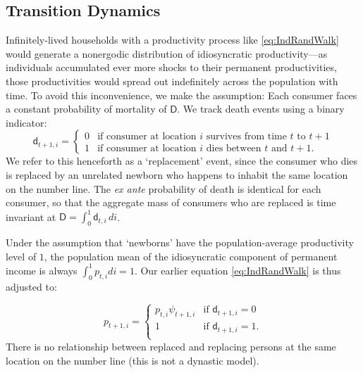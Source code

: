 \documentclass[titlepage]{./econtex}
\begin{document}
\subsection{Transition Dynamics}

Infinitely-lived households with a productivity process like \eqref{eq:IndRandWalk} would generate a nonergodic distribution of idiosyncratic productivity---as individuals accumulated ever more shocks to their permanent productivities, those productivities would spread out indefinitely across the population with time. To avoid this inconvenience, we make the \cite{blanchardFinite} assumption: Each consumer faces a constant probability of mortality of $\mathsf{D}$. We track death events using a binary indicator:
\begin{equation*}
\mathsf{d}_{t+1,i} =
  \begin{cases}
    0 & \text{if consumer at location $i$ survives from time $t$ to $t+1$}
\\    1 & \text{if consumer at location $i$ dies between $t$ and $t+1$}.
  \end{cases}
\end{equation*}
We refer to this henceforth as a `replacement' event, since the consumer who dies is replaced by an unrelated newborn who happens to inhabit the same location on the number line.  The {\it ex ante} probability of death is identical for each consumer, so that the aggregate mass of consumers who are replaced is time invariant at $\mathsf{D} = \int_{0}^{1} \mathsf{d}_{t,i}\,di$.

Under the assumption that `newborns' have the population-average productivity level of $1$, the population mean of the idiosyncratic component of permanent income is always $\int_{0}^{1} {p}_{t,i}di = 1$. Our earlier equation \eqref{eq:IndRandWalk} is thus adjusted to:

\begin{equation*}  
{p}_{t+1,i} =
  \begin{cases}
       {p}_{t,i} \psi_{t+1,i} & \text{if } \mathsf{d}_{t+1,i} = 0 \\
    1 & \text{if } \mathsf{d}_{t+1,i} = 1. \\
  \end{cases}
\end{equation*}
 There is no relationship between replaced and replacing persons at the same location on the number line (this is not a dynastic model).
\end{document}
